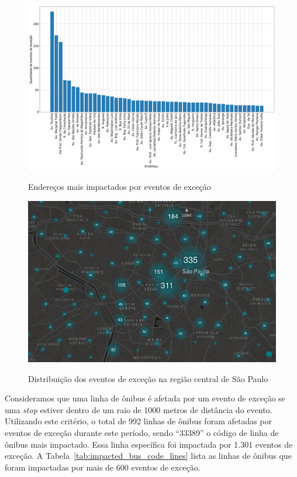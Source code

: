 \documentclass[
	12pt,				%
	oneside,			%
	a4paper,			%
	english,			%
	brazil				%
	]{abntex2ppgsi}
\begin{document}
{{{\begin{figure}[!htb]
	\centering
 	  \caption{Endereços mais impactados por eventos de exceção}
		\includegraphics[width=1\linewidth]{images/address_analysis_pt.png}
	\label{fig:address_analysis}
\end{figure}

\begin{figure}[!htb]
	\centering
 	  \caption{Distribuição dos eventos de exceção na região central de São Paulo}
		\includegraphics[width=1\linewidth]{images/exception_events_sp.png}
	\label{fig:dispersion}
\end{figure}

Consideramos que uma linha de ônibus é afetada por um evento de exceção se uma \textit{stop} estiver dentro de um raio de 1000 metros de distância do evento. Utilizando este critério, o total de 992 linhas de ônibus foram afetadas por eventos de exceção durante este período, sendo ``33389'' o código de linha de ônibus mais impactado. Essa linha específica foi impactada por 1.301 eventos de exceção. A Tabela~\ref{tab:impacted_bus_code_lines} lista as linhas de ônibus que foram impactadas por mais de 600 eventos de exceção.

}}}
\end{document}
